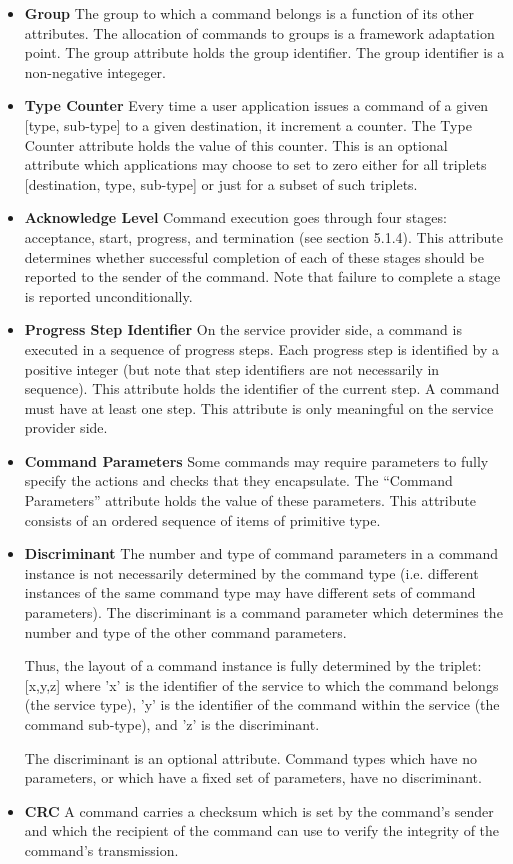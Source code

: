 \begin{itemize}
\item \textbf{Group}
The group to which a command belongs is a function of its other attributes. The allocation of commands to groups is a framework adaptation point. The group attribute holds the group identifier. The group identifier is a non-negative integeger.

\item \textbf{Type Counter}
Every time a user application issues a command of a given [type, sub-type] to a given destination, it increment a counter. The Type Counter attribute holds the value of this counter. This is an optional attribute which applications may choose to set to zero either for all triplets [destination, type, sub-type] or just for a subset of such triplets.

\item \textbf{Acknowledge Level}
Command execution goes through four stages: acceptance, start, progress, and termination (see section 5.1.4). This attribute determines whether successful completion of each of these stages should be reported to the sender of the command. Note that failure to complete a stage is reported unconditionally.

\item \textbf{Progress Step Identifier}
On the service provider side, a command is executed in a sequence of progress steps. Each progress step is identified by a positive integer (but note that step identifiers are not necessarily in sequence). This attribute holds the identifier of the current step. A command must have at least one step. This attribute is only meaningful on the service provider side.

\item \textbf{Command Parameters}
Some commands may require parameters to fully specify the actions and checks that they encapsulate. The “Command Parameters” attribute holds the value of these parameters. This attribute consists of an ordered sequence of items of primitive type. 

\item \textbf{Discriminant}
The number and type of command parameters in a command instance is not necessarily determined by the command type (i.e. different instances of the same command type may have different sets of command parameters). The discriminant is a command parameter which determines the number and type of the other command parameters. 

Thus, the layout of a command instance is fully determined by the triplet: [x,y,z] where 'x' is the identifier of the service to which the command belongs (the service type), 'y' is the identifier of the command within the service (the command sub-type), and 'z' is the discriminant. 

The discriminant is an optional attribute. Command types which have no parameters, or which have a fixed set of parameters, have no discriminant.

\item \textbf{CRC}
A command carries a checksum which is set by the command's sender and which the recipient of the command can use to verify the integrity of the command's transmission. 
\end{itemize}

